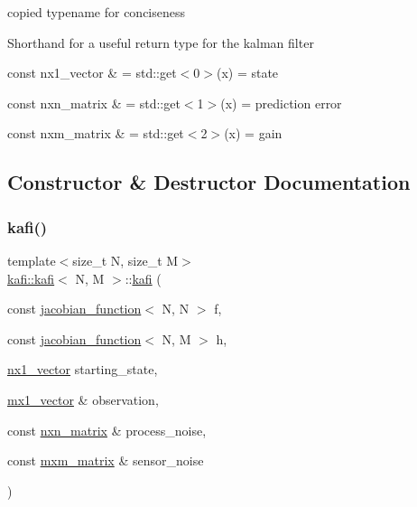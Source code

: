 copied typename for conciseness 

Shorthand for a useful return type for the kalman filter
\begin{DoxyItemize}
\item {\ttfamily const nx1\+\_\+vector \& = std\+::get$<$0$>$(x)} = state
\item {\ttfamily const nxn\+\_\+matrix \& = std\+::get$<$1$>$(x)} = prediction error
\item {\ttfamily const nxm\+\_\+matrix \& = std\+::get$<$2$>$(x)} = gain 
\end{DoxyItemize}

\subsection{Constructor \& Destructor Documentation}
\mbox{\label{classkafi_1_1kafi_aa77148b74aeb52b1d4853aaf02bb06a8}} 
\subsubsection{\texorpdfstring{kafi()}{kafi()}\hspace{0.1cm}{\footnotesize\ttfamily [1/2]}}
{\footnotesize\ttfamily template$<$size\+\_\+t N, size\+\_\+t M$>$ \\
\hyperlink{classkafi_1_1kafi}{kafi\+::kafi}$<$ N, M $>$\+::\hyperlink{classkafi_1_1kafi}{kafi} (\begin{DoxyParamCaption}\item[{const \hyperlink{classkafi_1_1jacobian__function}{jacobian\+\_\+function}$<$ N, N $>$}]{f,  }\item[{const \hyperlink{classkafi_1_1jacobian__function}{jacobian\+\_\+function}$<$ N, M $>$}]{h,  }\item[{\hyperlink{classkafi_1_1kafi_a47144ae2efe936ede222eced035a6e46}{nx1\+\_\+vector}}]{starting\+\_\+state,  }\item[{\hyperlink{classkafi_1_1kafi_a3a6f412f435a9e1f81178f36965822c3}{mx1\+\_\+vector} \&}]{observation,  }\item[{const \hyperlink{classkafi_1_1kafi_a771d8045a61e16033e4a644675b5f4e7}{nxn\+\_\+matrix} \&}]{process\+\_\+noise,  }\item[{const \hyperlink{classkafi_1_1kafi_af3ca34ea0c57e9054e4c2d51fc7e5971}{mxm\+\_\+matrix} \&}]{sensor\+\_\+noise }\end{DoxyParamCaption})\hspace{0.3cm}{\ttfamily [inline]}}



